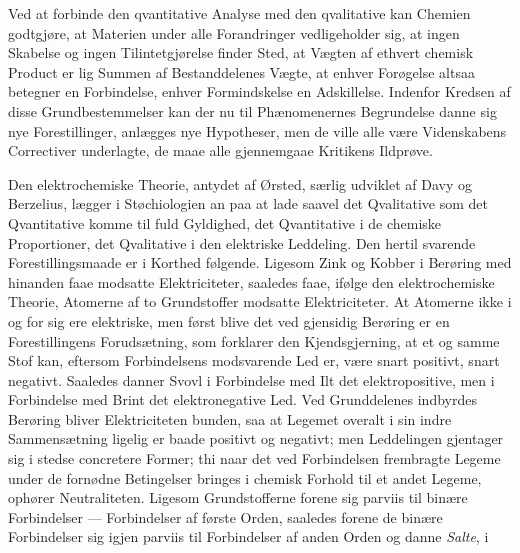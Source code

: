 \documentclass[12pt,a4paper]{book}
\begin{document}
Ved at forbinde den qvantitative Analyse med den qvalitative kan Chemien
godtgjøre, at Materien under alle Forandringer vedligeholder sig, at ingen
Skabelse og ingen Tilintetgjørelse finder Sted, at Vægten af ethvert
chemisk Product er lig Summen af Bestanddelenes Vægte, at enhver Forøgelse
altsaa betegner en Forbindelse, enhver Formindskelse en Adskillelse.
Indenfor Kredsen af disse Grundbestemmelser kan der nu til Phænomenernes
Begrundelse danne sig nye Forestillinger, anlægges nye Hypotheser, men de
ville alle være Videnskabens Correctiver underlagte, de maae alle
gjennemgaae Kritikens Ildprøve.

Den elektrochemiske Theorie, antydet af Ørsted, særlig udviklet af Davy og
Berzelius, lægger i Støchiologien an paa at lade saavel det Qvalitative
som det Qvantitative komme til fuld Gyldighed, det Qvantitative i de
chemiske Proportioner, det Qvalitative i den elektriske Leddeling. Den
hertil svarende Forestillingsmaade er i Korthed følgende.
Ligesom Zink og Kobber i Berøring med hinanden faae modsatte
Elektriciteter, saaledes faae, ifølge den elektrochemiske Theorie,
Atomerne af to Grundstoffer modsatte Elektriciteter. At Atomerne ikke i og
for sig ere elektriske, men først blive det ved gjensidig Berøring er en
Forestillingens Forudsætning, som forklarer den Kjendsgjerning, at et og
samme Stof kan, eftersom Forbindelsens modsvarende Led er, være snart
positivt, snart negativt. Saaledes danner Svovl i Forbindelse med Ilt det
elektropositive, men i Forbindelse med Brint det elektronegative Led. Ved
Grunddelenes indbyrdes Berøring bliver Elektriciteten bunden, saa at
Legemet overalt i sin indre Sammensætning ligelig er baade positivt og
negativt; men Leddelingen gjentager sig i stedse concretere Former; thi
naar det ved Forbindelsen frembragte Legeme under de fornødne Betingelser
bringes i chemisk Forhold til et andet Legeme, ophører Neutraliteten.
Ligesom Grundstofferne forene sig parviis til binære Forbindelser ---
Forbindelser af første Orden, saaledes forene de binære Forbindelser sig
igjen parviis til Forbindelser af anden Orden og danne \emph{Salte}, i
\end{document}
